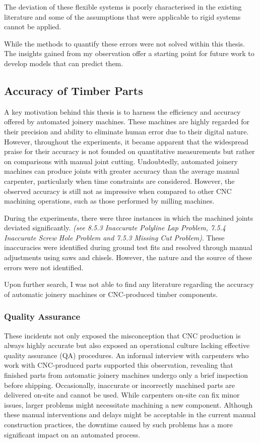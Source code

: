 The deviation of these flexible systems is poorly characterised in the existing literature and some of the assumptions that were applicable to rigid systems cannot be applied. 

While the methods to quantify these errors were not solved within this thesis. The insights gained from my observation offer a starting point for future work to develop models that can predict them. 

\subsection{Accuracy of Timber Parts}

A key motivation behind this thesis is to harness the efficiency and accuracy offered by automated joinery machines. These machines are highly regarded for their precision and ability to eliminate human error due to their digital nature. However, throughout the experiments, it became apparent that the widespread praise for their accuracy is not founded on quantitative measurements but rather on comparisons with manual joint cutting. Undoubtedly, automated joinery machines can produce joints with greater accuracy than the average manual carpenter, particularly when time constraints are considered. However, the observed accuracy is still not as impressive when compared to other CNC machining operations, such as those performed by milling machines.

During the experiments, there were three instances in which the machined joints deviated significantly. \textit{(see 8.5.3 Inaccurate Polyline Lap Problem, 7.5.4 Inaccurate Screw Hole Problem and 7.5.3 Missing Cut Problem)}. These inaccuracies were identified during ground test fits and resolved through manual adjustments using saws and chisels. However, the nature and the source of these errors were not identified. 

Upon further search, I was not able to find any literature regarding the accuracy of automatic joinery machines or CNC-produced timber components.

\subsubsection{Quality Assurance}

These incidents not only exposed the misconception that CNC production is always highly accurate but also exposed an operational culture lacking effective quality assurance (QA) procedures. An informal interview with carpenters who work with CNC-produced parts supported this observation, revealing that finished parts from automatic joinery machines undergo only a brief inspection before shipping. Occasionally, inaccurate or incorrectly machined parts are delivered on-site and cannot be used. While carpenters on-site can fix minor issues, larger problems might necessitate machining a new component. Although these manual interventions and delays might be acceptable in the current manual construction practices, the downtime caused by such problems has a more significant impact on an automated process.

